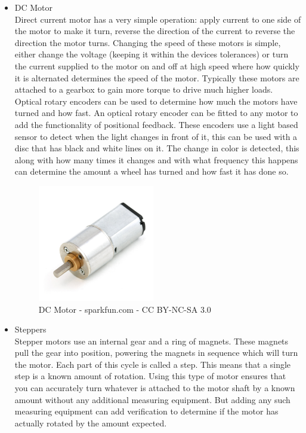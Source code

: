 \begin{itemize}
\item DC Motor
\\Direct current motor has a very simple operation: apply current to one side of the motor to make it turn, reverse the direction of the current to reverse the direction the motor turns.  Changing the speed of these motors is simple, either change the voltage (keeping it within the devices tolerances) or turn the current supplied to the motor on and off at high speed where how quickly it is alternated determines the speed of the motor.  Typically these motors are attached to a gearbox to gain more torque to drive much higher loads.  Optical rotary encoders can be used to determine how much the motors have turned and how fast.  An optical rotary encoder can be fitted to any motor to add the functionality of positional feedback.  These encoders use a light based sensor to detect when the light changes in front of it, this can be used with a disc that has black and white lines on it.  The change in color is detected, this along with how many times it changes and with what frequency this happens can determine the amount a wheel has turned and how fast it has done so.
\begin{figure}[h]
\centering
        \includegraphics[width=2.0in] {Images/dc-motor.jpg}
        \caption{DC Motor - sparkfun.com - CC BY-NC-SA 3.0}
        \label{DC Motor}
\end{figure}
\item Steppers
\\Stepper motors use an internal gear and a ring of magnets.  These magnets pull the gear into position, powering the magnets in sequence which will turn the motor.  Each part of this cycle is called a step.  This means that a single step is a known amount of rotation.  Using this type of motor ensures that you can accurately turn whatever is attached to the motor shaft by a known amount without any additional measuring equipment.  But adding any such measuring equipment can add verification to determine if the motor has actually rotated by the amount expected.

\end{itemize}
